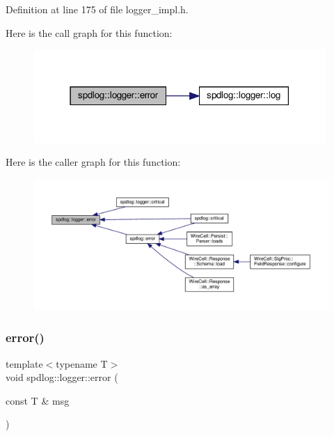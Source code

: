 Definition at line 175 of file logger\+\_\+impl.\+h.

Here is the call graph for this function\+:
\nopagebreak
\begin{figure}[H]
\begin{center}
\leavevmode
\includegraphics[width=315pt]{classspdlog_1_1logger_a144338f88fd2d2bec2cae951e214a9a5_cgraph}
\end{center}
\end{figure}
Here is the caller graph for this function\+:
\nopagebreak
\begin{figure}[H]
\begin{center}
\leavevmode
\includegraphics[width=350pt]{classspdlog_1_1logger_a144338f88fd2d2bec2cae951e214a9a5_icgraph}
\end{center}
\end{figure}
\mbox{\label{classspdlog_1_1logger_a9ce73acaa12b7dbbecde6ac3bc7353e5}} 
\subsubsection{\texorpdfstring{error()}{error()}\hspace{0.1cm}{\footnotesize\ttfamily [2/2]}}
{\footnotesize\ttfamily template$<$typename T$>$ \\
void spdlog\+::logger\+::error (\begin{DoxyParamCaption}\item[{const T \&}]{msg }\end{DoxyParamCaption})\hspace{0.3cm}{\ttfamily [inline]}}



